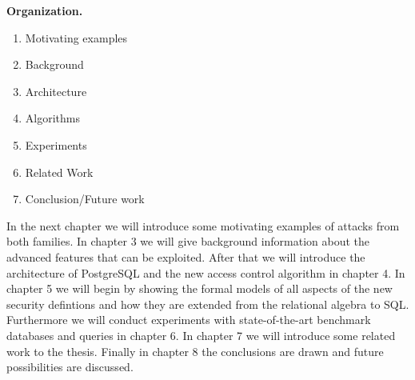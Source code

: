 \smallskip
\noindent
{\bf Organization.}
\begin{enumerate}
	\item Motivating examples
	\item Background
	\item Architecture
	\item Algorithms
	\item Experiments
	\item Related Work
	\item Conclusion/Future work
\end{enumerate}
In the next chapter we will introduce some motivating examples of attacks from both families. In chapter 3 we will give background information about the advanced features that can be exploited. After that we will introduce the architecture of PostgreSQL and the new access control algorithm in chapter 4. In chapter 5 we will begin by showing the formal models of all aspects of the new security defintions and how they are extended from the relational algebra to SQL. Furthermore we will conduct experiments with state-of-the-art benchmark databases and queries in chapter 6. In chapter 7 we will introduce some related work to the thesis. Finally in chapter 8 the conclusions are drawn and future possibilities are discussed.
